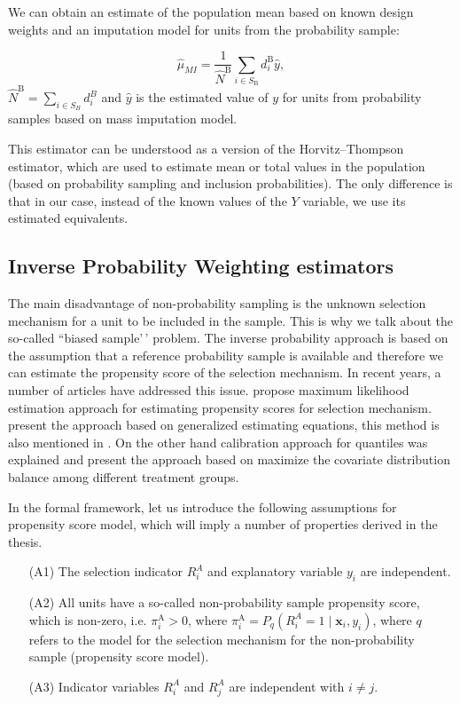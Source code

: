 \documentclass[
]{jss}
\begin{document}
We can obtain an estimate of the population mean based on known design
weights and an imputation model for units from the probability sample:

\begin{equation}
\hat{\mu}_{M I}=\frac{1}{\hat{N}^{\mathrm{B}}} \sum_{i \in S_{\mathrm{B}}} d_i^{\mathrm{B}} \hat{y}, 
\end{equation} \(\hat{N}^{\mathrm{B}} = \sum_{i \in S_B} d_i^B\) and
\(\hat{y}\) is the estimated value of \(y\) for units from probability
samples based on mass imputation model.

This estimator can be understood as a version of the Horvitz--Thompson
estimator, which are used to estimate mean or total values in the
population (based on probability sampling and inclusion probabilities).
The only difference is that in our case, instead of the known values of
the \(Y\) variable, we use its estimated equivalents.

\hypertarget{inverse-probability-weighting-estimators}{%
\subsection{Inverse Probability Weighting
estimators}\label{inverse-probability-weighting-estimators}}

The main disadvantage of non-probability sampling is the unknown
selection mechanism for a unit to be included in the sample. This is why
we talk about the so-called ``biased sample'\,' problem. The inverse
probability approach is based on the assumption that a reference
probability sample is available and therefore we can estimate the
propensity score of the selection mechanism. In recent years, a number
of articles have addressed this issue. \citet{chen2020doubly} propose
maximum likelihood estimation approach for estimating propensity scores
for selection mechanism. \citet{wu2022statistical} present the approach
based on generalized estimating equations, this method is also mentioned
in \citet{yang_doubly_2020}. On the other hand calibration approach for
quantiles was explained \citet{beresewicz2024inference} and
\citet{santanna_covariate_2022} present the approach based on maximize
the covariate distribution balance among different treatment groups.

In the formal framework, let us introduce the following assumptions for
propensity score model, which will imply a number of properties derived
in the thesis.

\begin{itemize}
    \item[(A1)] The selection indicator $R_i^A$ and explanatory variable $y_i$ are independent.
    \item[(A2)]All units have a so-called non-probability sample propensity score, which is non-zero, i.e. $\pi_i^{\mathrm{A}} > 0$, where $\pi_i^{\mathrm{A}} = P_q\left(R_i^A=1 \mid \boldsymbol{x}_i, y_i\right)$, where $q$ refers to the model for the selection mechanism for the non-probability sample (propensity score model).
    \item[(A3)] Indicator variables $R_i^A$ and $R_j^A$ are independent with $i \neq j$. 
\end{itemize}
\end{document}

